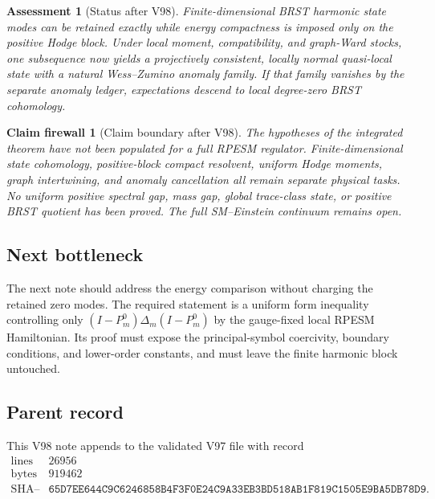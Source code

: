 \documentclass[11pt]{article}
\newtheorem{firewall}[theorem]{Claim firewall}
\newtheorem{assessment}[theorem]{Assessment}
\theoremstyle{remark}
\begin{document}
\begin{assessment}[Status after V98]
\label{ass:v12v98-status}
Finite-dimensional BRST harmonic state modes can be retained
exactly while energy compactness is imposed only on the positive
Hodge block.  Under local moment, compatibility, and graph-Ward
stocks, one subsequence now yields a projectively consistent,
locally normal quasi-local state with a natural Wess--Zumino
anomaly family.  If that family vanishes by the separate anomaly
ledger, expectations descend to local degree-zero BRST cohomology.
\end{assessment}

\begin{firewall}[Claim boundary after V98]
\label{fire:v12v98-claim}
The hypotheses of the integrated theorem have not been populated
for a full RPESM regulator.  Finite-dimensional state cohomology,
positive-block compact resolvent, uniform Hodge moments, graph
intertwining, and anomaly cancellation all remain separate physical
tasks.  No uniform positive spectral gap, mass gap, global
trace-class state, or positive BRST quotient has been proved.  The
full SM--Einstein continuum remains open.
\end{firewall}

\subsection{Next bottleneck}

The next note should address the energy comparison without charging
the retained zero modes.  The required statement is a uniform form
inequality controlling only
\((I-P_m^0)\Delta_m(I-P_m^0)\) by the gauge-fixed local RPESM
Hamiltonian.  Its proof must expose the principal-symbol coercivity,
boundary conditions, and lower-order constants, and must leave the
finite harmonic block untouched.

\subsection{Parent record}

This V98 note appends to the validated V97 file with record
\[
\begin{array}{c|c}
\text{lines}&26956\\
\text{bytes}&919462\\
\text{SHA--256}&
\texttt{65D7EE644C9C6246858B4F3F0E24C9A33EB3BD518AB1F819C1505E9BA5DB78D9}.
\end{array}
\]
\end{document}
